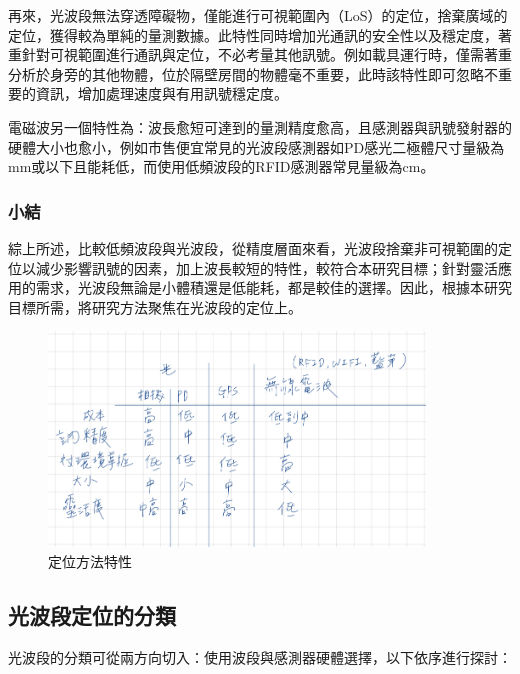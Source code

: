         
        
        再來，光波段無法穿透障礙物，僅能進行可視範圍內（LoS）的定位，捨棄廣域的定位，獲得較為單純的量測數據。此特性同時增加光通訊的安全性以及穩定度，著重針對可視範圍進行通訊與定位，不必考量其他訊號。例如載具運行時，僅需著重分析於身旁的其他物體，位於隔壁房間的物體毫不重要，此時該特性即可忽略不重要的資訊，增加處理速度與有用訊號穩定度。

        

        電磁波另一個特性為：波長愈短可達到的量測精度愈高，且感測器與訊號發射器的硬體大小也愈小，例如市售便宜常見的光波段感測器如PD感光二極體尺寸量級為mm或以下\cite{datasheet:led_sfh4545}且能耗低，而使用低頻波段的RFID感測器常見量級為cm\cite{datasheet:rfid_tag}。


    \subsubsection{小結}

        
        
        綜上所述，比較低頻波段與光波段，從精度層面來看，光波段捨棄非可視範圍的定位以減少影響訊號的因素，加上波長較短的特性，較符合本研究目標；針對靈活應用的需求，光波段無論是小體積還是低能耗，都是較佳的選擇。因此，根據本研究目標所需，將研究方法聚焦在光波段的定位上。

        \begin{figure}[ht]
            \centering
            \includegraphics[width=10cm]{ch2pic/method_compare.jpg}
            \caption{定位方法特性}
            \label{pic:method_compare}
        \end{figure}

    \subsection{光波段定位的分類}

        

        光波段的分類可從兩方向切入：使用波段與感測器硬體選擇，以下依序進行探討：

